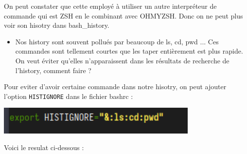 \documentclass[12pt]{article}
\begin{document}
\vspace{0.3cm}

On peut constater que cette employé à utiliser un autre interpréteur de commande qui est ZSH en le combinant avec OHMYZSH. Donc on ne peut plus voir son hisotry dans bash\_history.

\vspace{0.3cm}

\begin{itemize}
  \item Nos history sont souvent pollués par beaucoup de ls, cd, pwd ... Ces commandes sont tellement courtes que les taper entièrement est plus rapide. On veut éviter qu'elles n'apparaissent dans les résultats de recherche de l'history, comment faire ?
\end{itemize}

\vspace{0.3cm}

Pour eviter d'avoir certaine commande dans notre hisotry, on peut ajouter l'option \texttt{HISTIGNORE} dans le fichier bashrc : 

\vspace{0.3cm}

\begin{center}
  \includegraphics[width=10cm]{Image-TD-4/HISTIGNORE.png}
\end{center}

\vspace{0.3cm}

\newpage

Voici le resulat ci-dessous : 

\vspace{0.3cm}
\end{document}

